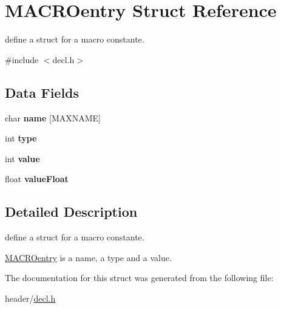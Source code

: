 \hypertarget{struct_m_a_c_r_oentry}{}\section{M\+A\+C\+R\+Oentry Struct Reference}
\label{struct_m_a_c_r_oentry}


define a struct for a macro constante.  




{\ttfamily \#include $<$decl.\+h$>$}

\subsection*{Data Fields}
\begin{DoxyCompactItemize}
\item 
\mbox{\label{struct_m_a_c_r_oentry_afdd40a771835cf5f3511c7ac6fb6e664}} 
char {\bfseries name} \mbox{[}M\+A\+X\+N\+A\+ME\mbox{]}
\item 
\mbox{\label{struct_m_a_c_r_oentry_ac765329451135abec74c45e1897abf26}} 
int {\bfseries type}
\item 
\mbox{\label{struct_m_a_c_r_oentry_ac4f474c82e82cbb89ca7c36dd52be0ed}} 
int {\bfseries value}
\item 
\mbox{\label{struct_m_a_c_r_oentry_ab271bf689e787edf8ddff375682937d2}} 
float {\bfseries value\+Float}
\end{DoxyCompactItemize}


\subsection{Detailed Description}
define a struct for a macro constante. 

\hyperlink{struct_m_a_c_r_oentry}{M\+A\+C\+R\+Oentry} is a name, a type and a value. 

The documentation for this struct was generated from the following file\+:\begin{DoxyCompactItemize}
\item 
header/\hyperlink{decl_8h}{decl.\+h}\end{DoxyCompactItemize}
